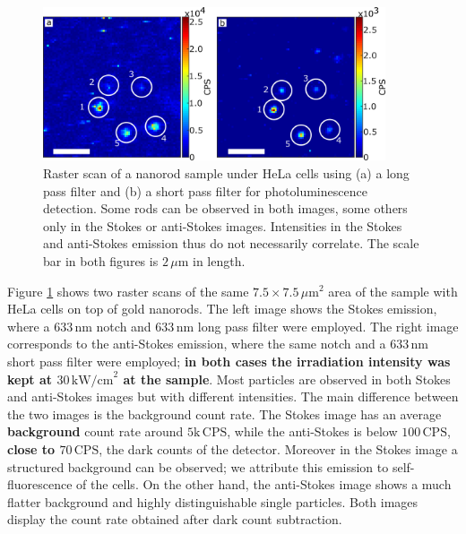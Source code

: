 \documentclass[journal=nalefd,manuscript=letter]{achemso}
\newcommand{\nm}{\ensuremath{\,\textrm{nm}}}
\newcommand{\um}{\ensuremath{\,\mu\textrm{m}}}
\newcommand{\pwr}{\ensuremath{\,\textrm{kW/cm}^2}}
\newcommand{\CPS}{\ensuremath{\,\textrm{CPS}}}
\begin{document}
\begin{figure}[htp] \centering
\includegraphics[width=0.9\textwidth]{Figures/04_Stokes_AS/stokes_as_no_dye.png}
\caption{Raster scan of a nanorod sample under HeLa cells using (a) a long pass
filter and (b) a short pass filter for photoluminescence detection.
Some rods can be observed in both images, some others only in the Stokes or
anti-Stokes images. Intensities in the Stokes and anti-Stokes emission thus do
not necessarily correlate. The scale bar in both figures is $2\um$ in length.}
	\label{fig:stokes_as_no_dye}
\end{figure}

Figure \ref{fig:stokes_as_no_dye} shows two raster scans of the same
$7.5\times7.5\um^2$ area of the sample with HeLa cells on top of gold nanorods.
The left image shows the Stokes emission, where a $633\nm$ notch and $633\nm$
long pass filter were employed. The right image corresponds to the anti-Stokes
emission, where the same notch and a $633\nm$ short pass filter were employed;
\textbf{in both cases the irradiation intensity was kept at $30\pwr$ at the
sample}. Most particles are observed in both Stokes and anti-Stokes images but
with different intensities. The main difference between the two images is the
background count rate. The Stokes image has an average \textbf{background} count
rate around $5\textrm{k}\CPS$, while the anti-Stokes is below $100\CPS$,
\textbf{close to $70\CPS$}, the dark counts of the detector. Moreover in the
Stokes image a structured background can be observed; we attribute this emission
to self-fluorescence of the cells. On the other hand, the anti-Stokes image
shows a much flatter background and highly distinguishable single particles.
Both images display the count rate obtained after dark count subtraction.
\end{document}
